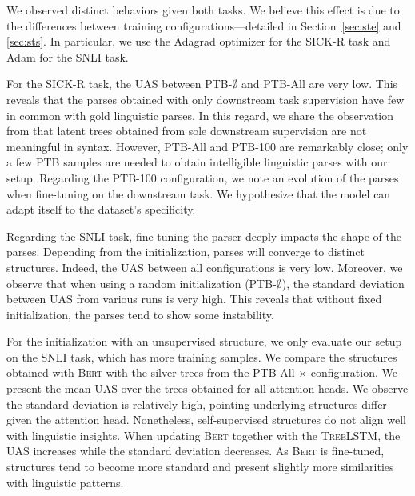We observed distinct behaviors given both tasks. We believe this effect is due to the differences between training configurations—detailed in Section~\ref{sec:ste} and \ref{sec:sts}. In particular, we use the Adagrad optimizer for the SICK-R task and Adam for the SNLI task.

For the SICK-R task, the UAS between PTB-$\emptyset$ and PTB-All are very low. This reveals that the parses obtained with only downstream task supervision have few in common with gold linguistic parses. In this regard, we share the observation from \textcite{williams_18} that latent trees obtained from sole downstream supervision are not meaningful in syntax. However, PTB-All and PTB-100 are remarkably close; only a few PTB samples are needed to obtain intelligible linguistic parses with our setup. Regarding the PTB-100 configuration, we note an evolution of the parses when fine-tuning on the downstream task. We hypothesize that the model can adapt itself to the dataset's specificity. 

Regarding the SNLI task, fine-tuning the parser deeply impacts the shape of the parses. Depending from the initialization, parses will converge to distinct structures. Indeed, the UAS between all configurations is very low. Moreover, we observe that when using a random initialization (PTB-$\emptyset$), the standard deviation between UAS from various runs is very high. This reveals that without fixed initialization, the parses tend to show some instability.

For the initialization with an unsupervised structure, we only evaluate our setup on the SNLI task, which has more training samples. We compare the structures obtained with \textsc{Bert} with the silver trees from the PTB-All-$\times$ configuration. We present the mean UAS over the trees obtained for all attention heads. We observe the standard deviation is relatively high, pointing underlying structures differ given the attention head. Nonetheless, self-supervised structures do not align well with linguistic insights. When updating \textsc{Bert} together with the \textsc{TreeLSTM}, the UAS increases while the standard deviation decreases. As \textsc{Bert} is fine-tuned, structures tend to become more standard and present slightly more similarities with linguistic patterns.


